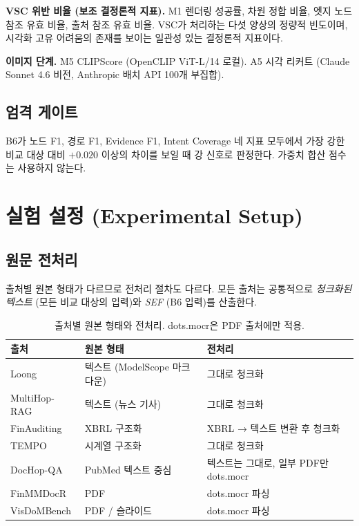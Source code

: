 \documentclass[11pt]{article}
\begin{document}
\textbf{VSC 위반 비율 (보조 결정론적 지표).} M1 렌더링 성공률, 차원 정합 비율, 엣지 노드 참조 유효 비율, 출처 참조 유효 비율. VSC가 처리하는 다섯 양상의 정량적 빈도이며, 시각화 고유 어려움의 존재를 보이는 일관성 있는 결정론적 지표이다.

\textbf{이미지 단계.} M5 CLIPScore (OpenCLIP ViT-L/14 로컬). A5 시각 리커트 (Claude Sonnet 4.6 비전, Anthropic 배치 API 100개 부집합).

\subsection{엄격 게이트}

B6가 노드 F1, 경로 F1, Evidence F1, Intent Coverage 네 지표 모두에서 가장 강한 비교 대상 대비 $+0.020$ 이상의 차이를 보일 때 강 신호로 판정한다. 가중치 합산 점수는 사용하지 않는다.

\section{실험 설정 (Experimental Setup)}

\subsection{원문 전처리}
\label{sec:preproc}

출처별 원본 형태가 다르므로 전처리 절차도 다르다. 모든 출처는 공통적으로 \emph{청크화된 텍스트} (모든 비교 대상의 입력)와 \emph{SEF} (B6 입력)를 산출한다.

\begin{table}[h]
\centering
\small
\begin{tabular}{lll}
\toprule
출처 & 원본 형태 & 전처리 \\
\midrule
Loong & 텍스트 (ModelScope 마크다운) & 그대로 청크화 \\
MultiHop-RAG & 텍스트 (뉴스 기사) & 그대로 청크화 \\
FinAuditing & XBRL 구조화 & XBRL → 텍스트 변환 후 청크화 \\
TEMPO & 시계열 구조화 & 그대로 청크화 \\
DocHop-QA & PubMed 텍스트 중심 & 텍스트는 그대로, 일부 PDF만 dots.mocr \\
FinMMDocR & PDF & dots.mocr 파싱 \\
VisDoMBench & PDF / 슬라이드 & dots.mocr 파싱 \\
\bottomrule
\end{tabular}
\caption{출처별 원본 형태와 전처리. dots.mocr은 PDF 출처에만 적용.}
\label{tab:preproc}
\end{table}
\end{document}
